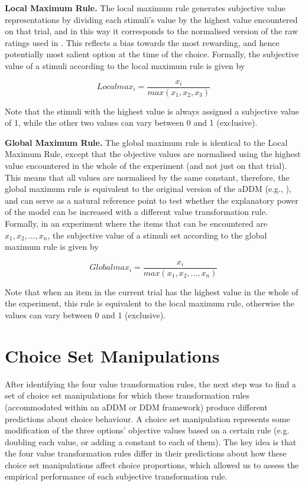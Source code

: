 \documentclass[11pt,a4paper]{article}
\begin{document}
\textbf{Local Maximum Rule.} The local maximum rule generates subjective value representations by dividing each stimuli's value by the highest value encountered on that trial, and in this way it corresponds to the normalised version of the raw ratings used in . This reflects a bias towards the most rewarding, and hence potentially most salient option at the time of the choice. Formally, the subjective value of a stimuli according to the local maximum rule is given by

\begin{equation}
Local max_{i}=\frac{x_i}{max(x_1,x_2,x_3)}
\label{eq:locmax}
\end{equation}

Note that the stimuli with the highest value is always assigned a subjective value of 1, while the other two values can vary between 0 and 1 (exclusive).

\textbf{Global Maximum Rule.} The global maximum rule is identical to the Local Maximum Rule, except that the objective values are normalised using the highest value encountered in the whole of the experiment (and not just on that trial). This means that all values are normalised by the same constant, therefore, the global maximum rule is equivalent to the original version of the aDDM (e.g., ), and can serve as a natural reference point to test whether the explanatory power of the model can be increased with a different value transformation rule. Formally, in an experiment where the items that can be encountered are $x_1, x_2, ..., x_n$, the subjective value of a stimuli set according to the global maximum rule is given by

\begin{equation}
Globalmax_{i}=\frac{x_i}{max(x_1,x_2,...,x_n)}
\label{eq:globmax}
\end{equation}

Note that when an item in the current trial has the highest value in the whole of the experiment, this rule is equivalent to the local maximum rule, otherwise the values can vary between 0 and 1 (exclusive). 

\section{Choice Set Manipulations} \label{chap1choicesetman}

After identifying the four value transformation rules, the next step was to find a set of choice set manipulations for which these transformation rules (accommodated within an aDDM or DDM framework) produce different predictions about choice behaviour. A choice set manipulation represents some modification of the three options' objective values based on a certain rule (e.g. doubling each value, or adding a constant to each of them). The key idea is that the four value transformation rules differ in their predictions about how these choice set manipulations affect choice proportions, which allowed us to assess the empirical performance of each subjective transformation rule. 
\end{document}
